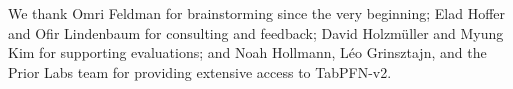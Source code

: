 \documentclass{article}
\begin{document}
\begin{ack}
We thank Omri Feldman for brainstorming since the very beginning; Elad Hoffer and Ofir Lindenbaum for consulting and feedback; David Holzmüller and Myung Kim for supporting evaluations; and Noah Hollmann, Léo Grinsztajn, and the Prior Labs team for providing extensive access to TabPFN-v2.
\end{ack}




\clearpage




% 
\end{document}
